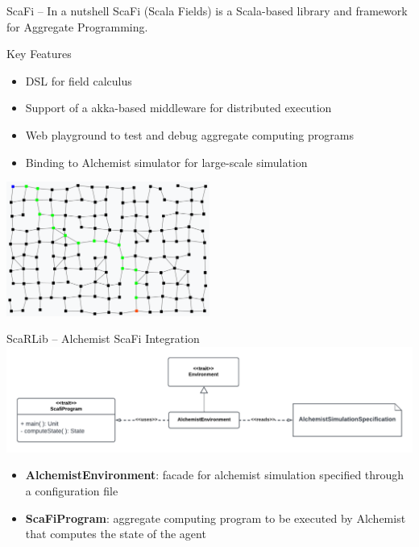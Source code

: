\documentclass[presentation, 9pt]{beamer}\mode<presentation>{\usetheme{AMSBolognaFC}}
\begin{document}
\begin{frame}{ScaFi -- In a nutshell}
ScaFi (Scala Fields) is a Scala-based library and framework for Aggregate Programming.
\begin{exampleblock}{Key Features}
	\begin{itemize}
		\item DSL for field calculus 
		\item Support of a akka-based middleware for distributed execution
		\item Web playground to test and debug aggregate computing programs
		\item Binding to Alchemist simulator for large-scale simulation
	\end{itemize}
\end{exampleblock}
\centering
\includegraphics[width=0.5\textwidth]{img/channel.png}
\end{frame}
\begin{frame}{ScaRLib -- Alchemist ScaFi Integration}
\includegraphics[width=\textwidth]{img/alchemist-scafi-arc.pdf}
\begin{itemize}
	\item \textbf{AlchemistEnvironment}: facade for alchemist simulation specified through a configuration file
	\item \textbf{ScaFiProgram}: aggregate computing program to be executed by Alchemist that computes the state of the agent
\end{itemize}
\end{frame}
\end{document}
